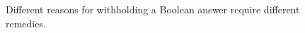 \begin{figure}[H]
\centering
{}
\caption{Different reasons for withholding a Boolean answer require different remedies.}\label{fig:teach-M03-06}
\end{figure}
